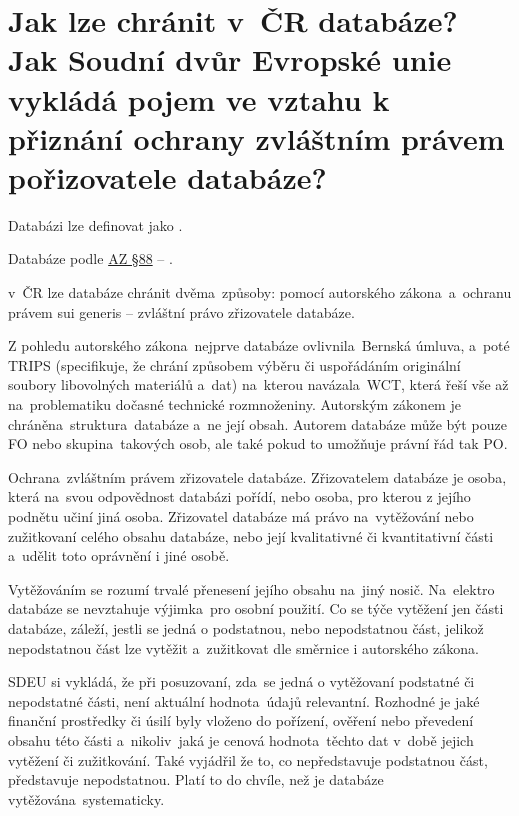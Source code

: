 \section{Jak lze chránit v~ČR databáze? Jak Soudní dvůr Evropské unie vykládá pojem  ve vztahu k přiznání ochrany zvláštním právem pořizovatele databáze?}

Databázi lze definovat jako .

Databáze podle \href{https://www.zakonyprolidi.cz/cs/2000-121#p88}{AZ §88} -- .

v~ČR lze databáze chránit dvěma~způsoby: pomocí autorského zákona~a~ochranu právem sui generis -- zvláštní právo zřizovatele databáze.

Z pohledu autorského zákona~nejprve databáze ovlivnila~Bernská úmluva, a~poté TRIPS (specifikuje, že chrání způsobem výběru či uspořádáním originální soubory libovolných materiálů a~dat) na~kterou navázala~WCT, která řeší vše až na~problematiku dočasné technické rozmnoženiny. Autorským zákonem je chráněna~struktura~databáze a~ne její obsah. Autorem databáze může být pouze FO nebo skupina~takových osob, ale také pokud to umožňuje právní řád tak PO\@.

Ochrana~zvláštním právem zřizovatele databáze. Zřizovatelem databáze je osoba, která na~svou odpovědnost databázi pořídí, nebo osoba, pro kterou z jejího podnětu učiní jiná osoba. Zřizovatel databáze má právo na~vytěžování nebo zužitkovaní celého obsahu databáze, nebo její kvalitativné či kvantitativní části a~udělit toto oprávnění i jiné osobě.

Vytěžováním se rozumí trvalé přenesení jejího obsahu na~jiný nosič. Na~elektro databáze se nevztahuje výjimka~pro osobní použití. Co se týče vytěžení jen části databáze, záleží, jestli se jedná o podstatnou, nebo nepodstatnou část, jelikož nepodstatnou část lze vytěžit a~zužitkovat dle směrnice i autorského zákona.

SDEU si vykládá, že při posuzovaní, zda~se jedná o vytěžovaní podstatné či nepodstatné části, není aktuální hodnota~údajů relevantní. Rozhodné je jaké finanční prostředky či úsilí byly vloženo do pořízení, ověření nebo převedení obsahu této části a~nikoliv~jaká je cenová hodnota~těchto dat v~době jejich vytěžení či zužitkování. Také vyjádřil že to, co nepředstavuje podstatnou část, představuje nepodstatnou. Platí to do chvíle, než je databáze vytěžována~systematicky.


